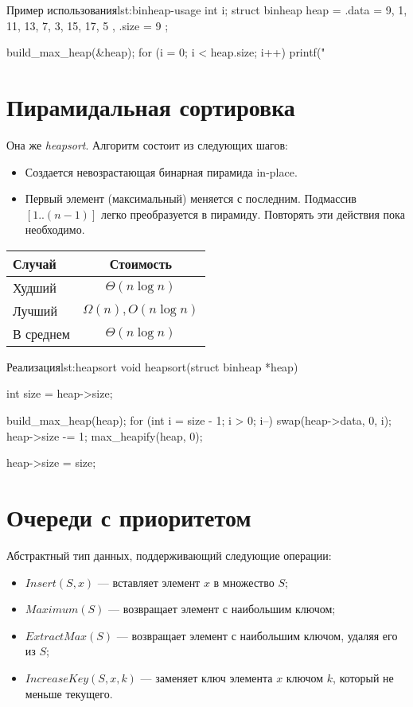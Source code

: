 \begin{clst}{Пример использования}{lst:binheap-usage}
int i;
struct binheap heap = {
    .data = { 9, 1, 11, 13, 7, 3, 15, 17, 5 },
    .size = 9
};

build_max_heap(&heap);
for (i = 0; i < heap.size; i++)
    printf("%
\end{clst}

\section{Пирамидальная сортировка}
\label{sec:heapsort}

Она же \emph{heapsort}. Алгоритм состоит из следующих шагов:
\begin{itemize}
  \item Создается невозрастающая бинарная пирамида in-place.
  \item Первый элемент (максимальный) меняется с последним. Подмассив $[1..(n - 1)]$ легко преобразуется в пирамиду. Повторять эти действия пока необходимо.
\end{itemize}

\begin{center}
  \begin{tabular}{lc}
    \toprule
    Случай & Стоимость \\
    \midrule
    Худший & $\Theta(n \log n)$ \\
    Лучший & $\Omega(n), O(n \log n)$ \\
    В среднем & $\Theta(n \log n)$ \\
    \bottomrule
  \end{tabular}
\end{center}

\begin{clst}{Реализация}{lst:heapsort}
void heapsort(struct binheap *heap)
{
    int size = heap->size;

    build_max_heap(heap);
    for (int i = size - 1; i > 0; i--) {
        swap(heap->data, 0, i);
        heap->size -= 1;
        max_heapify(heap, 0);
    }

    heap->size = size;
}
\end{clst}

\section{Очереди с приоритетом}
\label{sec:priority-queues}

Абстрактный тип данных, поддерживающий следующие операции:
\begin{itemize}
  \item $Insert(S, x)$ --- вставляет элемент $x$ в множество $S$;
  \item $Maximum(S)$ --- возвращает элемент с наибольшим ключом;
  \item $ExtractMax(S)$ --- возвращает элемент с наибольшим ключом, удаляя его из $S$;
  \item $IncreaseKey(S, x, k)$ --- заменяет ключ элемента $x$ ключом $k$, который не меньше текущего.
\end{itemize}

